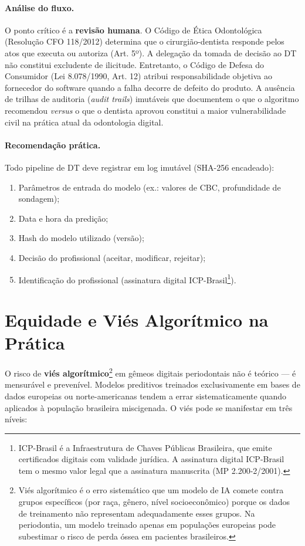 \paragraph{Análise do fluxo.}
O ponto crítico é a \textbf{revisão humana}. O Código de Ética Odontológica (Resolução CFO 118/2012) determina que o cirurgião-dentista responde pelos atos que executa ou autoriza (Art. 5º). A delegação da tomada de decisão ao DT não constitui excludente de ilicitude. Entretanto, o Código de Defesa do Consumidor (Lei 8.078/1990, Art. 12) atribui responsabilidade objetiva ao fornecedor do software quando a falha decorre de defeito do produto. A ausência de trilhas de auditoria (\textit{audit trails}) imutáveis que documentem o que o algoritmo recomendou \textit{versus} o que o dentista aprovou constitui a maior vulnerabilidade civil na prática atual da odontologia digital.

\paragraph{Recomendação prática.}
Todo pipeline de DT deve registrar em log imutável (SHA-256 encadeado):
\begin{enumerate}
    \item Parâmetros de entrada do modelo (ex.: valores de CBC, profundidade de sondagem);
    \item Data e hora da predição;
    \item Hash do modelo utilizado (versão);
    \item Decisão do profissional (aceitar, modificar, rejeitar);
    \item Identificação do profissional (assinatura digital ICP-Brasil\footnote[9]{ICP-Brasil é a Infraestrutura de Chaves Públicas Brasileira, que emite certificados digitais com validade jurídica. A assinatura digital ICP-Brasil tem o mesmo valor legal que a assinatura manuscrita (MP 2.200-2/2001).}).
\end{enumerate}

\section{Equidade e Viés Algorítmico na Prática}

O risco de \textbf{viés algorítmico}\footnote[10]{Viés algorítmico é o erro sistemático que um modelo de IA comete contra grupos específicos (por raça, gênero, nível socioeconômico) porque os dados de treinamento não representam adequadamente esses grupos. Na periodontia, um modelo treinado apenas em populações europeias pode subestimar o risco de perda óssea em pacientes brasileiros.} em gêmeos digitais periodontais não é teórico — é mensurável e prevenível. Modelos preditivos treinados exclusivamente em bases de dados europeias ou norte-americanas tendem a errar sistematicamente quando aplicados à população brasileira miscigenada. O viés pode se manifestar em três níveis:

